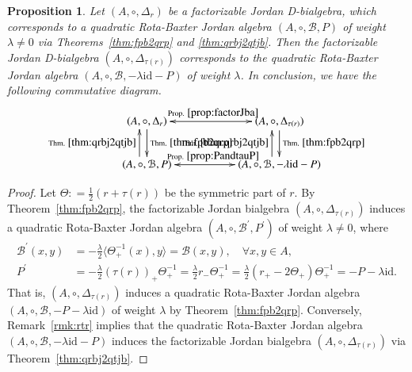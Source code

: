 \documentclass[12pt, reqno, a4paper]{amsart}
\newtheorem{proposition}[theorem]{Proposition}
\theoremstyle{definition}
\newcommand{\id}{\mathrm{id}}
\begin{document}
\begin{proposition}
	Let $(A, \circ, \Delta_r)$ be a factorizable Jordan D-bialgebra, which corresponds to a quadratic Rota-Baxter Jordan algebra $(A, \circ, \mathcal{B}, P)$ of weight $\lambda \neq 0$ via Theorems~\ref{thm:fpb2qrp} and \ref{thm:qrbj2qtjb}.
	Then the factorizable Jordan D-bialgebra $(A, \circ, \Delta_{\tau{(r)}})$ corresponds to the quadratic Rota-Baxter Jordan algebra $(A, \circ, \mathcal{B}, - \lambda \id - P)$ of weight $\lambda$.
	In conclusion, we have the following commutative diagram.
	\begin{displaymath}
		\xymatrix{
			(A, \circ, \Delta_r) \ar@{<->}[rr]^{\mathrm{Prop.}~\ref{prop:factorJba}}\ar@{->}[d]^{\mathrm{Thm.}~\ref{thm:fpb2qrp}}& & (A, \circ, \Delta_{\tau(r)}) \ar@{->}[d]^{\mathrm{Thm.}~\ref{thm:fpb2qrp}} \\
			(A, \circ, \mathcal{B}, P) \ar@<1.5ex>[u]^{\mathrm{Thm.}~\ref{thm:qrbj2qtjb}} \ar@{<->}[rr]^{\mathrm{Prop}.~\ref{prop:PandtauP} }& & (A, \circ, \mathcal{B}, -\lambda \id -P) \ar@<1.5ex>[u]^{\mathrm{Thm.}~\ref{thm:qrbj2qtjb}}}
	\end{displaymath}
\end{proposition}
\begin{proof}
	Let $\Theta: = \frac{1}{2}(r + \tau(r))$ be the symmetric part of $r$. 
	By Theorem~\ref{thm:fpb2qrp}, the factorizable Jordan bialgebra $(A, \circ, \Delta_{\tau(r)})$ induces a quadratic Rota-Baxter Jordan algebra $(A, \circ, \mathcal{B}^{\prime}, P^{\prime})$ of weight $\lambda \ne 0$, where
	\begin{align*}
		\mathcal{B}^{\prime}(x, y) & =-\frac{\lambda}{2}\langle \Theta_{+}^{-1} (x) , y \rangle= \mathcal{B}(x, y), \quad \forall x, y \in A, \\
		P^{\prime} & = -\frac{\lambda}{2} (\tau(r))_{+}  \Theta_{+}^{-1} = \frac{\lambda}{2} r_{-}  \Theta_{+}^{-1} = \frac{\lambda}{2} (r_{+}  - 2 \Theta_{+})  \Theta_{+}^{-1} = -P -\lambda \mathrm{id}.
	\end{align*}
	That is, $(A,\circ, \Delta_{\tau(r)})$ induces a quadratic Rota-Baxter Jordan algebra $(A, \circ, \mathcal{B}, -P -\lambda \mathrm{id})$ of weight $\lambda$ by Theorem~\ref{thm:fpb2qrp}.
	Conversely, Remark~\ref{rmk:rtr} implies that the quadratic Rota-Baxter Jordan algebra $(A, \circ, \mathcal{B}, -\lambda \mathrm{id}-P)$ induces the factorizable Jordan bialgebra $(A, \circ, \Delta_{\tau(r)})$ via Theorem~\ref{thm:qrbj2qtjb}.
\end{proof}
\end{document}
